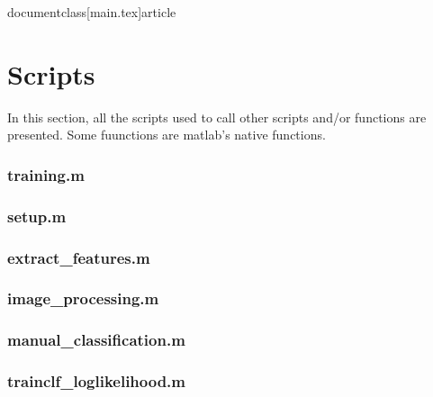 documentclass[main.tex]{article}


\newpage
\appendix \label{appendix}

\section{Scripts}
In this section, all the scripts used to call other scripts and/or functions are presented. Some fuunctions are matlab's native functions.

\subsubsection*{\hypertarget{training}{training.m}}


\subsubsection*{\hypertarget{setup}{setup.m}}


\subsubsection*{\hypertarget{extractfeat}{extract\_features.m}}


\subsubsection*{\hypertarget{imageprocessing}{image\_processing.m}}


\subsubsection*{\hypertarget{manclf}{manual\_classification.m}}


\subsubsection*{\hypertarget{trainclf}{trainclf\_loglikelihood.m}}


